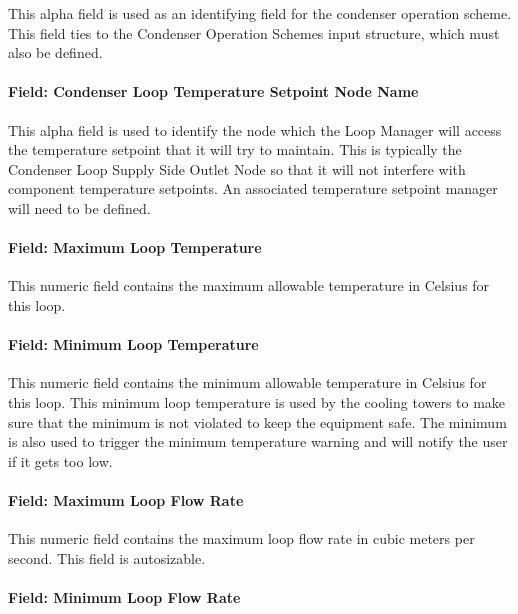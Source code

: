This alpha field is used as an identifying field for the condenser operation scheme. This field ties to the Condenser Operation Schemes input structure, which must also be defined.

\paragraph{Field: Condenser Loop Temperature Setpoint Node Name}\label{field-condenser-loop-temperature-setpoint-node-name}

This alpha field is used to identify the node which the Loop Manager will access the temperature setpoint that it will try to maintain. This is typically the Condenser Loop Supply Side Outlet Node so that it will not interfere with component temperature setpoints. An associated temperature setpoint manager will need to be defined.

\paragraph{Field: Maximum Loop Temperature}\label{field-maximum-loop-temperature-1}

This numeric field contains the maximum allowable temperature in Celsius for this loop.

\paragraph{Field: Minimum Loop Temperature}\label{field-minimum-loop-temperature-1}

This numeric field contains the minimum allowable temperature in Celsius for this loop. This minimum loop temperature is used by the cooling towers to make sure that the minimum is not violated to keep the equipment safe. The minimum is also used to trigger the minimum temperature warning and will notify the user if it gets too low.

\paragraph{Field: Maximum Loop Flow Rate}\label{field-maximum-loop-flow-rate-1}

This numeric field contains the maximum loop flow rate in cubic meters per second. This field is autosizable.

\paragraph{Field: Minimum Loop Flow Rate}\label{field-minimum-loop-flow-rate-1}

